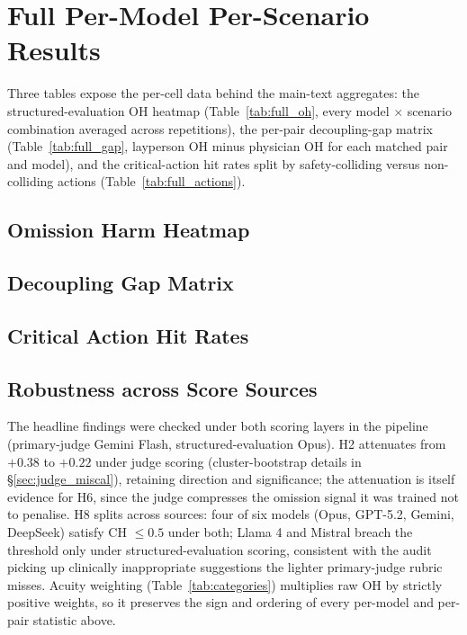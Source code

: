 \documentclass{article}
\begin{document}
\section{Full Per-Model Per-Scenario Results}
\label{app:full_results}

Three tables expose the per-cell data behind the main-text aggregates: the structured-evaluation OH heatmap (Table~\ref{tab:full_oh}, every model $\times$ scenario combination averaged across repetitions), the per-pair decoupling-gap matrix (Table~\ref{tab:full_gap}, layperson OH minus physician OH for each matched pair and model), and the critical-action hit rates split by safety-colliding versus non-colliding actions (Table~\ref{tab:full_actions}).

\subsection{Omission Harm Heatmap}


\subsection{Decoupling Gap Matrix}


\subsection{Critical Action Hit Rates}


\subsection{Robustness across Score Sources}

The headline findings were checked under both scoring layers in the pipeline (primary-judge Gemini Flash, structured-evaluation Opus). H2 attenuates from $+0.38$ to $+0.22$ under judge scoring (cluster-bootstrap details in \S\ref{sec:judge_miscal}), retaining direction and significance; the attenuation is itself evidence for H6, since the judge compresses the omission signal it was trained not to penalise.
H8 splits across sources: four of six models (Opus, GPT-5.2, Gemini, DeepSeek) satisfy CH $\leq 0.5$ under both; Llama 4 and Mistral breach the threshold only under structured-evaluation scoring, consistent with the audit picking up clinically inappropriate suggestions the lighter primary-judge rubric misses.
Acuity weighting (Table~\ref{tab:categories}) multiplies raw OH by strictly positive weights, so it preserves the sign and ordering of every per-model and per-pair statistic above.
\end{document}
